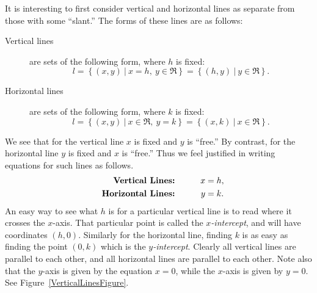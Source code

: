 It is interesting to first consider vertical and horizontal
lines as separate from those with some ``slant.'' 
The forms of these lines are as follows:
\begin{description}
\item[Vertical lines] are sets  of the following form, where $h$ is fixed: 
\begin{equation}l=\left\{(x,y)\ |\ x=h,\ y\in\Re\right\}
=\left\{(h,y)\ |\ y\in\Re\right\}.
\end{equation}
\item[Horizontal lines] are sets of the following form, where $k$ is fixed:
\begin{equation}
l=\left\{(x,y)\ | \ x\in\Re,\ y=k\right\}
=\left\{(x,k)\ |\ x\in\Re\right\}.\end{equation}
\end{description}
We see that for the vertical line $x$ is fixed and $y$ is ``free.''
By contrast, for the horizontal line $y$ is fixed and $x$ is ``free.''
Thus we feel justified in writing equations for such lines as follows.
\begin{alignat}{3}
&&\text{\bf Vertical Lines:}&&\qquad x&=h,\\
&&\text{\bf Horizontal Lines:}&&y&=k.
\end{alignat}
An easy way to see what $h$ is for a particular vertical
line is to 
read where it crosses the $x$-axis.  That particular point is called
the {\it $x$-intercept}, and will have coordinates $(h,0)$.
Similarly for the horizontal line, finding $k$ is as easy as
finding the point $(0,k)$ which is the {\it $y$-intercept}.
Clearly all vertical lines are parallel to each other, and
all horizontal lines are parallel to each other.
Note also that the $y$-axis is given by the equation $x=0$,
while the $x$-axis is given by $y=0$.  
See Figure~\ref{VerticalLinesFigure}.
